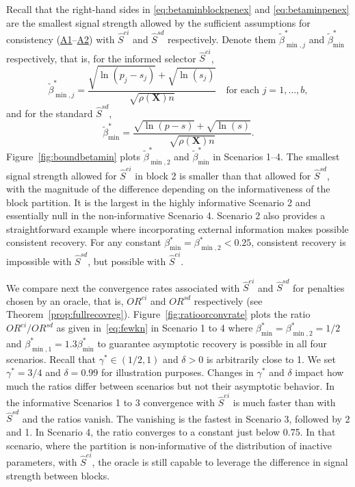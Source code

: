 \documentclass[
  12pt]{article}
\newcommand{\bX}{\mathbf{X}}
\begin{document}
Recall that the right-hand sides in \eqref{eq:betaminblockpenex} and \eqref{eq:betaminpenex} are the smallest signal strength allowed by the sufficient assumptions for consistency (\hyperlink{lab:A1}{A1}–\hyperlink{lab:A2}{A2}) with $\hat S^{ei}$ and $\hat S^{sd}$ respectively. Denote them $\tilde{\beta}^*_{\min,j}$ and $\tilde{\beta}^*_{\min}$ respectively, that is, for the informed selector $\hat S^{ei}$,
\begin{equation*}
\tilde{\beta}^*_{\min,j}
=
\frac{\sqrt{\ln(p_j-s_j)}+\sqrt{\ln(s_j)}}{\sqrt{\rho(\bX)n}}\quad\text{for each }j=1,\ldots,b,
\end{equation*}
and for the standard $\hat S^{sd}$,
\begin{equation*}
\tilde{\beta}^*_{\min}
=
\frac{\sqrt{\ln(p-s)}+\sqrt{\ln(s)}}{\sqrt{\rho(\bX)n}}.
\end{equation*}
Figure~\ref{fig:boundbetamin} plots $\tilde{\beta}^*_{\min,2}$ and $\tilde{\beta}^*_{\min}$ in Scenarios 1--4. The smallest signal strength allowed for $\hat S^{ei}$ in block 2 is smaller than that allowed for $\hat S^{sd}$, with the magnitude of the difference depending on the informativeness of the block partition. It is the largest in the highly informative Scenario 2 and essentially null in the non-informative Scenario 4. Scenario 2 also provides a straightforward example where incorporating external information makes possible consistent recovery. For any constant $\beta_{\min}^*=\beta_{\min,2}^*<0.25$, consistent recovery is impossible with $\hat S^{sd}$, but possible with $\hat S^{ei}$. 

We compare next the convergence rates associated with $\hat S^{ei}$ and $\hat S^{sd}$ for penalties chosen by an oracle, that is, ${OR}^{ei}$ and $OR^{sd}$ respectively (see Theorem~\ref{prop:fullrecovreg}). Figure~\ref{fig:ratioorconvrate} plots the ratio ${OR}^{ei}/OR^{sd}$ as given in~\eqref{eq:fewkn} in Scenario 1 to 4 where $\beta_{\min }^*=\beta_{\min,2}^*=1/2$ and  $\beta_{\min,1}^*=1.3\beta_{\min }^*$ to guarantee asymptotic recovery is possible in all four scenarios. Recall that $\gamma^*\in(1/2,1)$ and $\delta>0$ is arbitrarily close to 1. We set $\gamma^*=3/4$ and $\delta=0.99$ for illustration purposes. Changes in $\gamma^*$ and $\delta$ impact how much the ratios differ between scenarios but not their asymptotic behavior. In the informative Scenarios 1 to 3 convergence with $\hat S^{ei}$ is much faster than with $\hat S^{sd}$ and the ratios vanish. The vanishing is the fastest in Scenario 3, followed by 2 and 1. In Scenario 4, the ratio converges to a constant just below 0.75. In that scenario, where the partition is non-informative of the distribution of inactive parameters, with $\hat S^{ei}$, the oracle is still capable to leverage the difference in signal strength between blocks.
\end{document}
